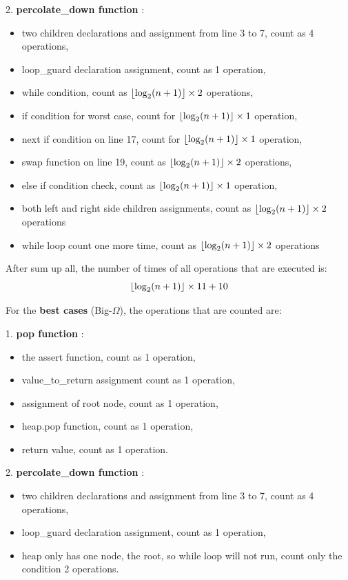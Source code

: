 \documentclass[11pt]{article}
\DeclarePairedDelimiter\floor{\lfloor}{\rfloor}
\begin{document}
2. \textbf{percolate\_down function} $\colon$
\begin{itemize}
\item two children declarations and assignment from line 3 to 7, count as 4 operations,
\item loop\_guard declaration assignment, count as 1 operation,
\item while condition, count as $\floor{ \log_2(n+1)} \times 2$ operations, 
\item if condition for worst case, count for $\floor{ \log_2(n+1)} \times 1$ operation,
\item next if condition on line 17, count for $\floor{ \log_2(n+1)} \times 1$ operation,
\item swap function on line 19, count as $\floor{ \log_2(n+1)} \times 2$ operations,
\item else if condition check, count as $\floor{ \log_2(n+1)} \times 1$ operation,
\item both left and right side children assignments, count as $\floor{ \log_2(n+1)} \times 2$ operations
\item while loop count one more time, count as $\floor{ \log_2(n+1)} \times 2$ operations
\end{itemize}

After sum up all, the number of times of all operations that are executed is$\colon$
\[
 \floor{ \log_2(n+1)} \times 11 + 10
\]

For the \textbf{best cases} (Big-$\Omega$), the operations that are counted are:

1. \textbf{pop function} $\colon$
\begin{itemize}
\item the assert function, count as 1 operation,
\item value\_to\_return assignment count as 1 operation,
\item assignment of root node, count as 1 operation,
\item heap.pop function, count as 1 operation,
\item return value, count as 1 operation.
\end{itemize}

2. \textbf{percolate\_down function} $\colon$
\begin{itemize}
\item two children declarations and assignment from line 3 to 7, count as 4 operations,
\item loop\_guard declaration assignment, count as 1 operation,
\item heap only has one node, the root, so while loop will not run, count only the condition 2 operations.
\end{itemize}
\end{document}
